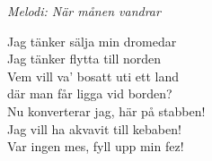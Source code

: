 {\footnotesize\textit{Melodi: När månen vandrar}}\par
\vspace{10pt}
Jag tänker sälja min dromedar\\
Jag tänker flytta till norden\\
Vem vill va' bosatt uti ett land\\
där man får ligga vid borden?\\
Nu konverterar jag, här på stabben!\\
Jag vill ha akvavit till kebaben!\\
Var ingen mes, fyll upp min fez!
